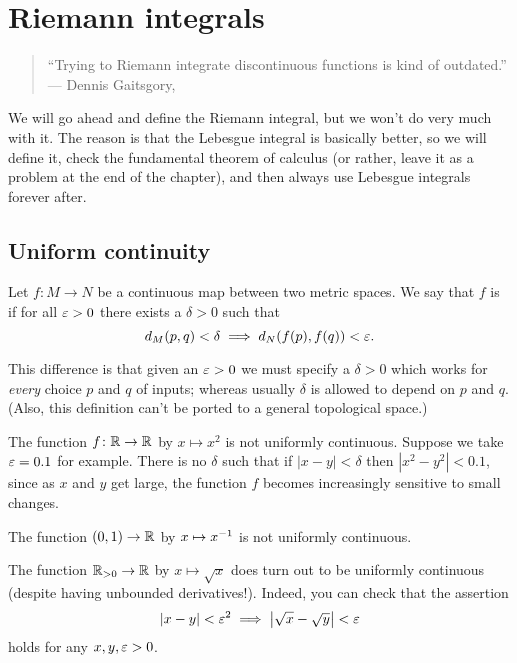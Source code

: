 \chapter{Riemann integrals}
\begin{quote}
	\footnotesize
	``Trying to Riemann integrate discontinuous
	functions is kind of outdated.'' \\
	--- Dennis Gaitsgory, \cite{ref:55b}
\end{quote}

We will go ahead and define the Riemann integral,
but we won't do very much with it.
The reason is that the Lebesgue integral is basically better,
so we will define it, check the fundamental theorem of calculus
(or rather, leave it as a problem at the end of the chapter),
and then always use Lebesgue integrals forever after.

\section{Uniform continuity}
\begin{definition}
	Let $f \colon M \to N$ be a continuous
	map between two metric spaces.
	We say that $f$ is  if
	for all $\varepsilon > 0$ there exists a $\delta > 0$ such that
	\[ d_M(p,q) < \delta \implies d_N(f(p), f(q)) < \varepsilon. \]
\end{definition}
This difference is that given an $\varepsilon > 0$ we must specify a $\delta > 0$
which works for \emph{every} choice $p$ and $q$ of inputs;
whereas usually $\delta$ is allowed to depend on $p$ and $q$.
(Also, this definition can't be ported
to a general topological space.)

\begin{example}
	\listhack
	\begin{enumerate}[(a)]
		\ii The function $f \colon \mathbb R \to \mathbb R$ by $x \mapsto x^2$
		is not uniformly continuous.
		Suppose we take $\varepsilon = 0.1$ for example.
		There is no $\delta$ such that if $|x-y| < \delta$
		then $|x^2-y^2| < 0.1$,
		since as $x$ and $y$ get large,
		the function $f$ becomes increasingly sensitive
		to small changes.

		\ii The function $(0,1) \to \mathbb R$ by $x \mapsto x^{-1}$
		is not uniformly continuous.

		\ii The function $\mathbb R_{>0} \to \mathbb R$ by $x \mapsto \sqrt x$
		does turn out to be uniformly continuous
		(despite having unbounded derivatives!).
		Indeed, you can check that the assertion
		\[ \left\lvert x-y  \right\rvert < \varepsilon^2
			\implies \left\lvert \sqrt x - \sqrt y \right\rvert
			< \varepsilon \]
		holds for any $x, y, \varepsilon > 0$.
	\end{enumerate}
\end{example}

